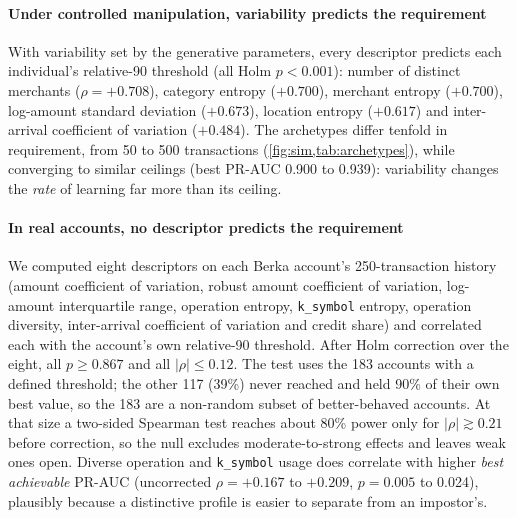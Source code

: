 \paragraph{Under controlled manipulation, variability predicts the requirement}
With variability set by the generative parameters, every descriptor predicts each individual's relative-90 threshold (all Holm $p<0.001$): number of distinct merchants ($\rho=+0.708$), category entropy ($+0.700$), merchant entropy ($+0.700$), log-amount standard deviation ($+0.673$), location entropy ($+0.617$) and inter-arrival coefficient of variation ($+0.484$). The archetypes differ tenfold in requirement, from 50 to 500 transactions (\cref{fig:sim,tab:archetypes}), while converging to similar ceilings (best PR-AUC 0.900 to 0.939): variability changes the \emph{rate} of learning far more than its ceiling.

\paragraph{In real accounts, no descriptor predicts the requirement}
We computed eight descriptors on each Berka account's 250-transaction history (amount coefficient of variation, robust amount coefficient of variation, log-amount interquartile range, operation entropy, \texttt{k\_symbol} entropy, operation diversity, inter-arrival coefficient of variation and credit share) and correlated each with the account's own relative-90 threshold. After Holm correction over the eight, all $p\ge0.867$ and all $|\rho|\le0.12$. The test uses the 183 accounts with a defined threshold; the other 117 (39\%) never reached and held 90\% of their own best value, so the 183 are a non-random subset of better-behaved accounts. At that size a two-sided Spearman test reaches about 80\% power only for $|\rho|\gtrsim0.21$ before correction, so the null excludes moderate-to-strong effects and leaves weak ones open. Diverse operation and \texttt{k\_symbol} usage does correlate with higher \emph{best achievable} PR-AUC (uncorrected $\rho=+0.167$ to $+0.209$, $p=0.005$ to 0.024), plausibly because a distinctive profile is easier to separate from an impostor's.

